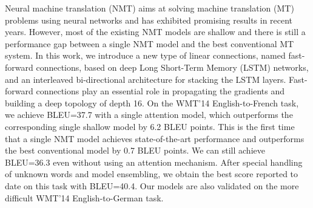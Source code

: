 Neural machine translation (NMT) aims at solving machine translation (MT) problems using neural networks and has exhibited promising results in recent years. However, most of the existing NMT models are shallow and there is still a performance gap between a single NMT model and the best conventional MT system.   In this work, we introduce a new type of linear connections, named fast-forward connections, based on deep Long Short-Term Memory (LSTM) networks, and an interleaved bi-directional architecture for stacking the LSTM layers. Fast-forward connections play an essential role in propagating the gradients and building a deep topology of depth 16. On the WMT'14 English-to-French task, we achieve BLEU=37.7 with a single attention model, which outperforms the corresponding single shallow model by 6.2 BLEU points. This is the first time that a single NMT model achieves state-of-the-art performance and outperforms the best conventional model by 0.7 BLEU points. We can still achieve BLEU=36.3 even without using an attention mechanism. After special handling of unknown words and model ensembling, we obtain the best score reported to date on this task with BLEU=40.4. Our models are also validated on the more difficult WMT'14 English-to-German task.
